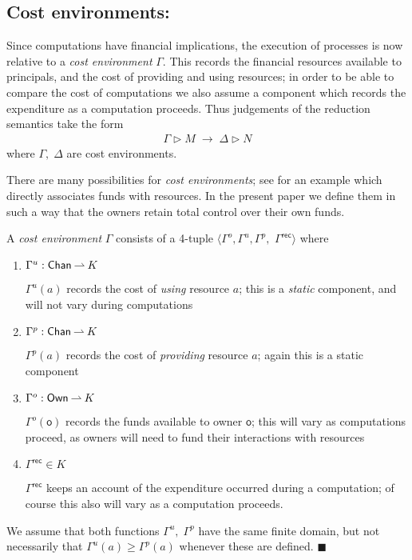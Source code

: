 \documentclass{LMCS}
\newcommand{\pfn}[1]{\mathsf{#1}}  \newcommand{\cfn}[1]{\mathsf{#1}}  \newcommand{\ownfnt}[1]{{\mathsf{#1}}}
\newcommand{\with}{\mathbin \rhd}
\newcommand{\Own}{\ensuremath{\pfn{Own}}\xspace}
\newcommand{\Chan}{\ensuremath{\pfn{Chan}}\xspace}
\newcommand{\record}{{\scriptstyle \mathsf{rec}}}
\newcommand{\Kost}{\ensuremath{K}\xspace}
\newcommand{\smalleval}{\longrightarrow}  \newcommand{\csmalleval}[1]{\longrightarrow^{#1}}
\newcommand{\EndDefBox}{\null\hfill$\blacksquare$}
\newcommand{\boxHere}{\global\let\EndProof\empty\EndDefBox}
\begin{document}
 
\subsection{Cost environments:}
Since computations have financial implications, the execution of
processes is now relative to a \emph{cost environment} $\Gamma$. This
records the financial resources available to principals, and the cost
of providing and using resources; in order to be able to compare the
cost of computations we also assume a component which records the
expenditure as a computation proceeds.
Thus judgements of the reduction semantics take the form
\begin{align*}
  \Gamma \with M \;\smalleval\; \Delta\with N
\end{align*}
where $\Gamma,\;\Delta$ are cost environments. 



There are many possibilities for \emph{cost environments}; see \cite{picost} 
for an example which directly associates funds with resources. In the present paper
we define them in such a way that the owners retain total control over their own funds. 

\begin{defi}\label{def:costenv}
A  \emph{cost environment} $\Gamma$ consists
of a 4-tuple $\langle \Gamma^o,\Gamma^u, \Gamma^p,$ $\Gamma^{\record}\rangle$ where
\begin{enumerate}[$\bullet$]

\item 
$\Gamma^u: \Chan \parrow \Kost$

$\Gamma^u(a)$ records the cost of \emph{using} resource $a$; this is a
\emph{static} component, and will not vary during computations

\item 
$\Gamma^p: \Chan \parrow \Kost$

$\Gamma^p(a)$ records the cost of \emph{providing} resource $a$; again
this is a static component

\item 
$\Gamma^o: \Own \parrow \Kost$

$\Gamma^o({\ownfnt o})$ records the funds available to owner $\ownfnt
o$; this will vary as computations proceed, as owners will need to
fund their interactions with resources

\item $\Gamma^{\record} \in \Kost$ 

 $\Gamma^{\record}$ keeps an
account of the expenditure occurred during a computation; of course
this also will vary as a computation proceeds.
\end{enumerate}

\medspace We assume that both functions $\Gamma^u,\;\Gamma^p$ have the same
finite domain, but not necessarily that $\Gamma^u(a) \geq \Gamma^p(a)$
whenever these are defined. \boxHere
\end{defi}
\end{document}
